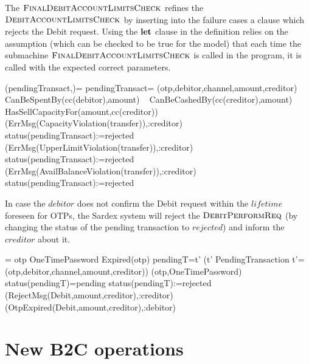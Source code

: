 The $\hbox{\sc FinalDebitAccountLimitsCheck}$ refines the  $\hbox{\sc DebitAccountLimitsCheck}$ by inserting into the failure cases a clause which rejects the Debit request. Using the $\mathrel{\mathbf{let}}$ clause in the definition relies on the assumption (which can be checked to be true for the model) that each time the submachine $\hbox{\sc FinalDebitAccountLimitsCheck}$ is called in the program, it is called with the expected correct parameters.

\begin{asm}
(pendingTransact,)=\+
  \LET pendingTransact= (otp,debitor,channel,amount,creditor)\\
  \IF CanBeSpentBy(cc(debitor),amount) \+
    \THEN ~ \IF CanBeCashedBy(cc(creditor),amount) \+
      \THEN ~ \IF HasSellCapacityFor(amount,cc(creditor)) \+
         \THEN ~  \\
         \ELSE \+
           (ErrMsg(CapacityViolation(transfer)),\TO :creditor)\\
            status(pendingTransact):=rejected \dec\-
     \ELSE \+
    (ErrMsg(UpperLimitViolation(transfer)),\TO :creditor)\\
     status(pendingTransact):=rejected \dec\-
  \ELSE \+
   (ErrMsg(AvailBalanceViolation(transfer)),\TO :creditor)\\
  status(pendingTransact):=rejected
\end{asm}


In case the $debitor$ does not confirm the Debit request within the $lifetime$ foreseen for OTPs, the Sardex system will reject the $\hbox{\sc DebitPerformReq}$ (by changing the status of the pending transaction to $rejected$) and inform the $creditor$ about it.

\begin{asm}  
 =\+           
  \IF otp \in OneTimePassword \AND Expired(otp)  \THEN \+
  \LET pendingT=\iota t' (t'  \in PendingTransaction \AND 
       t'=(otp,debitor,channel,amount,creditor))\+
       (otp,OneTimePassword) \\
      \IF status(pendingT)=pending \THEN \+
         status(pendingT):=rejected\\
         (RejectMsg(Debit,amount,creditor),\TO :creditor)\\  
         (OtpExpired(Debit,amount,creditor),\TO :debitor)  
\end{asm}

\section{New B2C operations}
\label{sect:userops}

